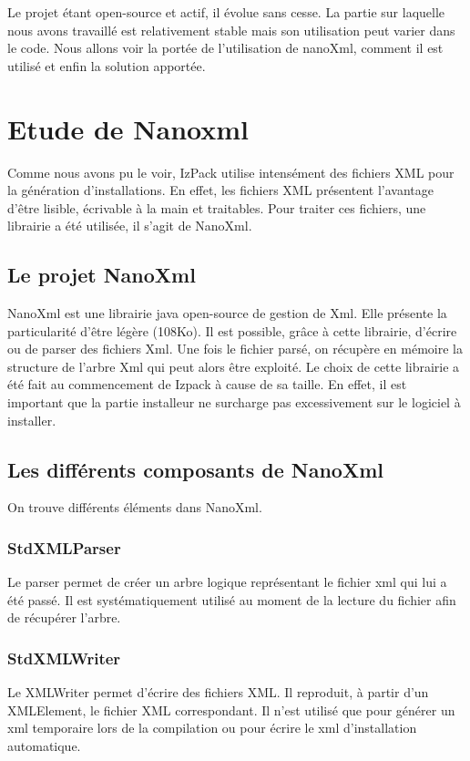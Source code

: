 Le projet étant open-source et actif, il évolue sans cesse. La partie sur laquelle nous avons travaillé est relativement stable mais son utilisation peut varier dans le code. Nous allons voir la portée de l'utilisation de nanoXml, comment il est utilisé et enfin la solution apportée.

\section{Etude de Nanoxml}
Comme nous avons pu le voir, IzPack utilise intensément des fichiers XML pour la génération d'installations.
En effet, les fichiers XML présentent l'avantage d'être lisible, écrivable à la main et traitables.
Pour traiter ces fichiers, une librairie a été utilisée, il s'agit de NanoXml.
\subsection{Le projet NanoXml}
NanoXml est une librairie java open-source de gestion de Xml.
Elle présente la particularité d'être légère (108Ko).
Il est possible, grâce à cette librairie, d'écrire ou de parser des fichiers Xml.
Une fois le fichier parsé, on récupère en mémoire la structure de l'arbre Xml qui peut alors être exploité.
Le choix de cette librairie a été fait au commencement de Izpack à cause de sa taille.
En effet, il est important que la partie installeur ne surcharge pas excessivement sur le logiciel à installer.

\subsection{Les différents composants de NanoXml}
On trouve différents éléments dans NanoXml.
\subsubsection{StdXMLParser}
Le parser permet de créer un arbre logique représentant le fichier xml qui lui a été passé.
Il est systématiquement utilisé au moment de la lecture du fichier afin de récupérer l'arbre.
\subsubsection{StdXMLWriter}
Le XMLWriter permet d'écrire des fichiers XML.
Il reproduit, à partir d'un XMLElement, le fichier XML correspondant.
Il n'est utilisé que pour générer un xml temporaire lors de la compilation ou pour écrire le xml d'installation automatique.

